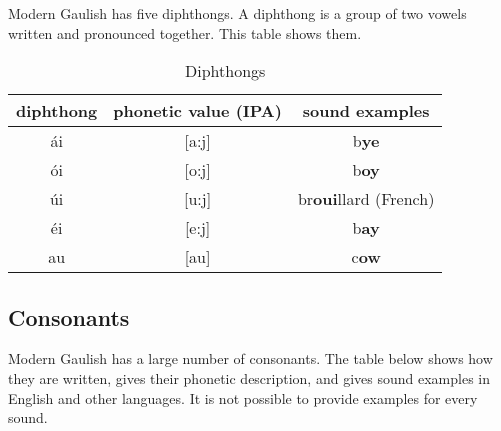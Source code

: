 \noindent Modern Gaulish has five diphthongs. A diphthong is a group of two vowels written and pronounced together. This table shows them.

\begin{table}[H]
\begin{center}
\begin{tabu}{|c|c|c|}
  \toprule
  diphthong & phonetic value (IPA) & sound examples\\
  \toprule
  \'{a}i & [a:j] & b\textbf{ye}\\
  \'{o}i & [o:j] & b\textbf{oy}\\
  \'{u}i & [u:j] & br\textbf{oui}llard (French)\\
  \'{e}i & [e:j] & b\textbf{ay}\\
  au & [au] & c\textbf{ow}\\
  \bottomrule
\end{tabu}
\end{center}
\caption{Diphthongs}
\label{phonology_diphthongs}
\end{table}

\subsection{Consonants}

\noindent Modern Gaulish has a large number of consonants. The table below shows how they are written, gives their phonetic description, and gives sound examples in English and other languages. It is not possible to provide examples for every sound.

